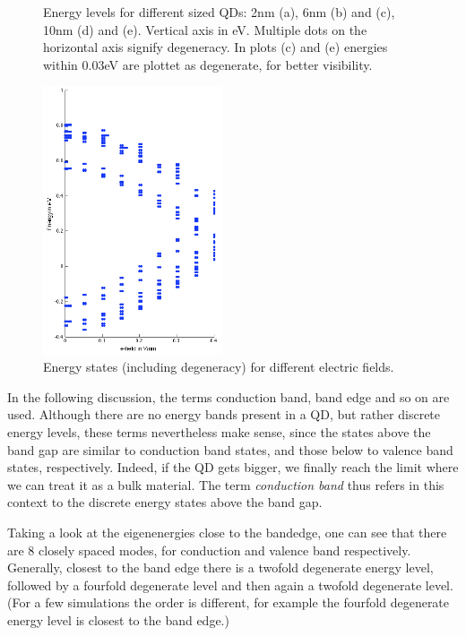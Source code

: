 \begin{figure}
\begin{subfigure}{60px}
		\caption{}
	\end{subfigure}
	\caption{Energy levels for different sized QDs: 2nm (a), 6nm (b) and (c), 10nm (d) and (e). Vertical axis in eV. Multiple dots on the horizontal axis signify degeneracy. In plots (c) and (e) energies within 0.03eV are plottet as degenerate, for better visibility.}
	\label{fig:e-levels}	
\end{figure}

\begin{figure}
	\centering
	\includegraphics[width=200px]{Fig/Plots/r25v.png}
	\caption{Energy states (including degeneracy) for different electric fields.}
	\label{fig:EvsVolt}
\end{figure}


\begin{REMARK}
In the following discussion, the terms conduction band, band edge and so on are used. Although there are no energy bands present in a QD, but rather discrete energy levels, these terms nevertheless make sense, since the states above the band gap are similar to conduction band states, and those below to valence band states, respectively. Indeed, if the QD gets bigger, we finally reach the limit where we can treat it as a bulk material. The term \textit{conduction band} thus refers in this context to the discrete energy states above the band gap.
\end{REMARK}
	
Taking a look at the eigenenergies close to the bandedge, one can see that there are 8 closely spaced modes, for conduction and valence band respectively. Generally, closest to the band edge there is a twofold degenerate energy level, followed by a fourfold degenerate level and then again a twofold degenerate level. (For a few simulations the order is different, for example the fourfold degenerate energy level is closest to the band edge.)
	
